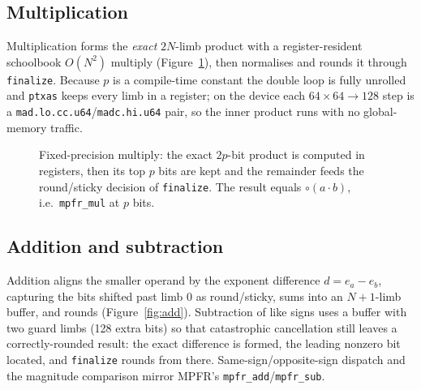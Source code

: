 \documentclass[11pt,a4paper]{article}
\newcommand{\code}[1]{\texttt{#1}}
\newcommand{\PB}{\ensuremath{p}}
\newcommand{\Nlimb}{\ensuremath{N}}
\newcommand{\round}{\ensuremath{\circ}}
\begin{document}
\subsection{Multiplication}
\label{sec:freal-mul}

Multiplication forms the \emph{exact} $2\Nlimb$-limb product with a
register-resident schoolbook $O(\Nlimb^2)$ multiply
(Figure~\ref{fig:mul}), then normalises and rounds it through \code{finalize}.
Because \PB{} is a compile-time constant the double loop is fully unrolled and
\code{ptxas} keeps every limb in a register; on the device each $64\times64\to128$
step is a \code{mad.lo.cc.u64}/\code{madc.hi.u64} pair, so the inner product runs
with no global-memory traffic.

\begin{figure}[h]
\centering
{}
\caption{Fixed-precision multiply: the exact $2\PB$-bit product is computed in
registers, then its top \PB{} bits are kept and the remainder feeds the
round/sticky decision of \code{finalize}. The result equals
$\round(a\cdot b)$, i.e.\ \code{mpfr\_mul} at \PB{} bits.}
\label{fig:mul}
\end{figure}

\subsection{Addition and subtraction}
\label{sec:freal-add}

Addition aligns the smaller operand by the exponent difference $d=e_a-e_b$,
capturing the bits shifted past limb $0$ as round/sticky, sums into an
$\Nlimb{+}1$-limb buffer, and rounds (Figure~\ref{fig:add}). Subtraction of like
signs uses a buffer with two guard limbs (128 extra bits) so that catastrophic
cancellation still leaves a correctly-rounded result: the exact difference is
formed, the leading nonzero bit located, and \code{finalize} rounds from there.
Same-sign/opposite-sign dispatch and the magnitude comparison mirror MPFR's
\code{mpfr\_add}/\code{mpfr\_sub}.
\end{document}
